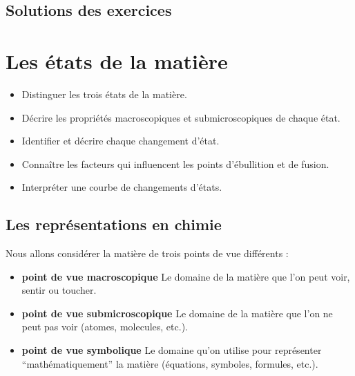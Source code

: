 \documentclass[
  11pt,
  a4paper,
  openany]{book}
\providecommand{\tightlist}{%
  \setlength{\itemsep}{0pt}\setlength{\parskip}{0pt}}
\begin{document}
\newpage

\section{Solutions des exercices} \shipoutAnswer

\hypertarget{les-uxe9tats-de-la-matiuxe8re}{%
\chapter{Les états de la matière}\label{les-uxe9tats-de-la-matiuxe8re}}

\begin{objectives}

\begin{itemize}
\tightlist
\item
  Distinguer les trois états de la matière.
\item
  Décrire les propriétés macroscopiques et submicroscopiques de chaque état.
\item
  Identifier et décrire chaque changement d'état.
\item
  Connaître les facteurs qui influencent les points d'ébullition et de fusion.
\item
  Interpréter une courbe de changements d'états.
\end{itemize}

\end{objectives}

\hypertarget{les-repruxe9sentations-en-chimie}{%
\section{Les représentations en chimie}\label{les-repruxe9sentations-en-chimie}}

Nous allons considérer la matière de trois points de vue différents :

\begin{itemize}
\tightlist
\item
  \textbf{point de vue macroscopique}
  Le domaine de la matière que l'on peut voir, sentir ou toucher.
\item
  \textbf{point de vue submicroscopique}
  Le domaine de la matière que l'on ne peut pas voir (atomes, molecules, etc.).
\item
  \textbf{point de vue symbolique}
  Le domaine qu'on utilise pour représenter ``mathématiquement'' la matière (équations, symboles, formules, etc.).
\end{itemize}
\end{document}
